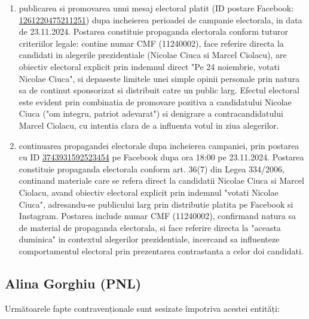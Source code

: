 \documentclass[a4paper,12pt]{article}
\begin{document}
\begin{enumerate}[leftmargin=*, label=\arabic*.)]
    \item publicarea si promovarea unui mesaj electoral platit (ID postare Facebook: \href{https://www.facebook.com/ads/library/?id=1261220475211251}{1261220475211251}) dupa incheierea perioadei de campanie electorala, in data de 23.11.2024. Postarea constituie propaganda electorala conform tuturor criteriilor legale: contine numar CMF (11240002), face referire directa la candidati in alegerile prezidentiale (Nicolae Ciuca si Marcel Ciolacu), are obiectiv electoral explicit prin indemnul direct "Pe 24 noiembrie, votati Nicolae Ciuca", si depaseste limitele unei simple opinii personale prin natura sa de continut sponsorizat si distribuit catre un public larg. Efectul electoral este evident prin combinatia de promovare pozitiva a candidatului Nicolae Ciuca ("om integru, patriot adevarat") si denigrare a contracandidatului Marcel Ciolacu, cu intentia clara de a influenta votul in ziua alegerilor.
    \item continuarea propagandei electorale dupa incheierea campaniei, prin postarea cu ID \href{https://www.facebook.com/ads/library/?id=3743931592523454}{3743931592523454} pe Facebook dupa ora 18:00 pe 23.11.2024. Postarea constituie propaganda electorala conform art. 36(7) din Legea 334/2006, continand materiale care se refera direct la candidatii Nicolae Ciuca si Marcel Ciolacu, avand obiectiv electoral explicit prin indemnul "votati Nicolae Ciuca", adresandu-se publicului larg prin distributie platita pe Facebook si Instagram. Postarea include numar CMF (11240002), confirmand natura sa de material de propaganda electorala, si face referire directa la "aceasta duminica" in contextul alegerilor prezidentiale, incercand sa influenteze comportamentul electoral prin prezentarea contrastanta a celor doi candidati.
\end{enumerate}

\vspace{0.5cm}

\subsection{Alina Gorghiu (PNL)}
Următoarele fapte contravenționale sunt sesizate împotriva acestei entități:
\end{document}

